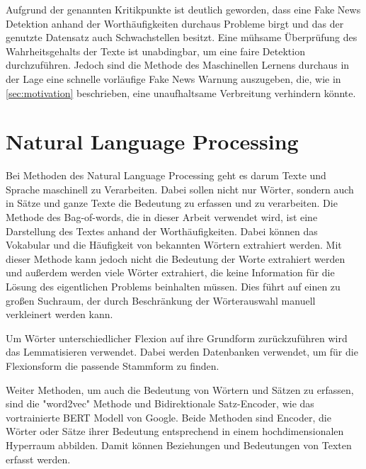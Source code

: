 Aufgrund der genannten Kritikpunkte ist deutlich geworden, dass eine Fake News Detektion anhand der Worthäufigkeiten 
durchaus Probleme birgt und das der genutzte Datensatz auch Schwachstellen besitzt.
Eine mühsame Überprüfung des Wahrheitsgehalts der Texte ist unabdingbar, um eine faire Detektion durchzuführen.
Jedoch sind die Methode des Maschinellen Lernens durchaus in der Lage eine schnelle 
vorläufige Fake News Warnung auszugeben, die, wie in \autoref{sec:motivation} beschrieben, eine unaufhaltsame 
Verbreitung verhindern könnte.


\appendix
\chapter{Natural Language Processing}
\label{sec:NLP}
Bei Methoden des Natural Language Processing geht es darum Texte und Sprache maschinell zu Verarbeiten. Dabei 
sollen nicht nur Wörter, sondern auch in Sätze und ganze Texte die Bedeutung zu erfassen und zu verarbeiten. 
Die Methode des Bag-of-words, die in dieser Arbeit verwendet wird, ist eine Darstellung des Textes anhand der 
Worthäufigkeiten. 
Dabei können das Vokabular und die Häufigkeit von bekannten Wörtern extrahiert werden. 
Mit dieser Methode kann jedoch nicht die Bedeutung der Worte extrahiert werden und außerdem werden viele Wörter 
extrahiert, die keine Information für die Lösung des eigentlichen Problems beinhalten müssen. 
Dies führt auf einen zu großen Suchraum, der durch Beschränkung der Wörterauswahl manuell verkleinert werden kann.

Um Wörter unterschiedlicher Flexion auf ihre Grundform zurückzuführen wird das Lemmatisieren verwendet. 
Dabei werden Datenbanken verwendet, um für die Flexionsform die passende Stammform zu finden.

Weiter Methoden, um auch die Bedeutung von Wörtern und Sätzen zu erfassen, sind die "word2vec" Methode und Bidirektionale Satz-Encoder, 
wie das vortrainierte BERT Modell von Google\cite{bert}. Beide Methoden sind Encoder, die Wörter oder Sätze ihrer 
Bedeutung entsprechend in einem hochdimensionalen Hyperraum abbilden. Damit können Beziehungen und Bedeutungen 
von Texten erfasst werden.


